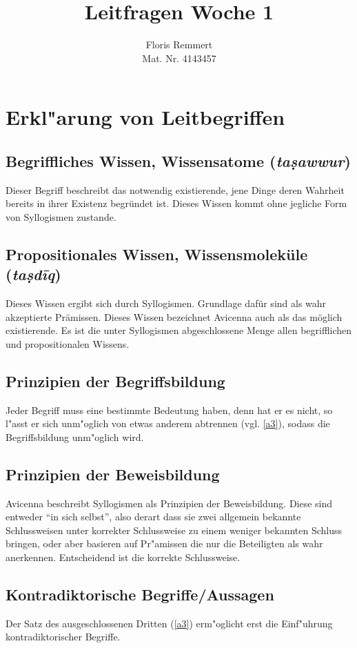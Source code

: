 \documentclass[a4paper,12pt]{article}
\title{Leitfragen Woche 1}
\author{Floris Remmert\\\small{Mat. Nr. 4143457}}
\begin{document}
\maketitle

%

\section{Erkl"arung von Leitbegriffen}
	\subsection{Begriffliches Wissen, Wissensatome (\textit{taṣawwur})}
		Dieser Begriff beschreibt das notwendig existierende, jene Dinge deren Wahrheit bereits in ihrer Existenz begründet ist. Dieses Wissen kommt ohne jegliche Form von Syllogismen zustande.
	\subsection{Propositionales Wissen, Wissensmoleküle (\textit{taṣdīq})}
		Dieses Wissen ergibt sich durch Syllogismen. Grundlage dafür sind als wahr akzeptierte Prämissen. Dieses Wissen bezeichnet Avicenna auch als das möglich existierende. Es ist die unter Syllogismen abgeschlossene Menge allen begrifflichen und propositionalen Wissens.
	\subsection{Prinzipien der Begriffsbildung}
		Jeder Begriff muss eine bestimmte Bedeutung haben, denn hat er es nicht, so l"asst er sich unm"oglich von etwas anderem abtrennen (vgl. \ref{a3}), sodass die Begriffsbildung unm"oglich wird.
	\subsection{Prinzipien der Beweisbildung}
		Avicenna beschreibt Syllogismen als Prinzipien der Beweisbildung. Diese sind entweder "`in sich selbst"', also derart dass sie zwei allgemein bekannte Schlussweisen unter korrekter Schlussweise zu einem weniger bekannten Schluss bringen, oder aber basieren auf Pr"amissen die nur die Beteiligten als wahr anerkennen. Entscheidend ist die korrekte Schlussweise.
	\subsection{Kontradiktorische Begriffe/Aussagen}
		Der Satz des ausgeschlossenen Dritten (\ref{a3}) erm"oglicht erst die Einf"uhrung kontradiktorischer Begriffe.
\end{document}
